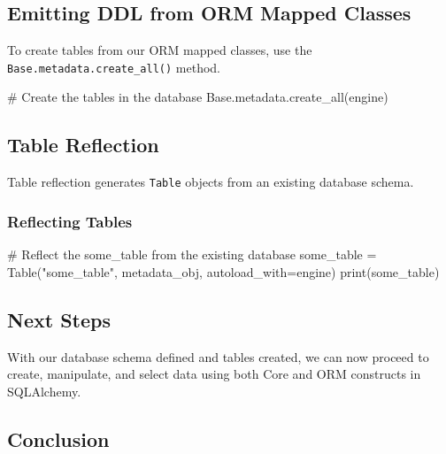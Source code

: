 \documentclass[
  letterpaper,
  DIV=11,
  numbers=noendperiod]{scrreprt}
\newenvironment{Shaded}{\begin{snugshade}}{\end{snugshade}}
\newcommand{\BuiltInTok}[1]{\textcolor[rgb]{0.00,0.23,0.31}{#1}}
\newcommand{\CommentTok}[1]{\textcolor[rgb]{0.37,0.37,0.37}{#1}}
\newcommand{\NormalTok}[1]{\textcolor[rgb]{0.00,0.23,0.31}{#1}}
\newcommand{\OperatorTok}[1]{\textcolor[rgb]{0.37,0.37,0.37}{#1}}
\newcommand{\StringTok}[1]{\textcolor[rgb]{0.13,0.47,0.30}{#1}}
\begin{document}
\subsection{Emitting DDL from ORM Mapped
Classes}\label{emitting-ddl-from-orm-mapped-classes}

To create tables from our ORM mapped classes, use the
\texttt{Base.metadata.create\_all()} method.

\begin{Shaded}
\begin{Highlighting}[]
\CommentTok{\# Create the tables in the database}
\NormalTok{Base.metadata.create\_all(engine)}
\end{Highlighting}
\end{Shaded}

\subsection{Table Reflection}\label{table-reflection}

Table reflection generates \texttt{Table} objects from an existing
database schema.

\subsubsection{Reflecting Tables}\label{reflecting-tables}

\begin{Shaded}
\begin{Highlighting}[]
\CommentTok{\# Reflect the some\_table from the existing database}
\NormalTok{some\_table }\OperatorTok{=}\NormalTok{ Table(}\StringTok{"some\_table"}\NormalTok{, metadata\_obj, autoload\_with}\OperatorTok{=}\NormalTok{engine)}
\BuiltInTok{print}\NormalTok{(some\_table)}
\end{Highlighting}
\end{Shaded}

\subsection{Next Steps}\label{next-steps}

With our database schema defined and tables created, we can now proceed
to create, manipulate, and select data using both Core and ORM
constructs in SQLAlchemy.

\subsection{Conclusion}\label{conclusion-18}
\end{document}
